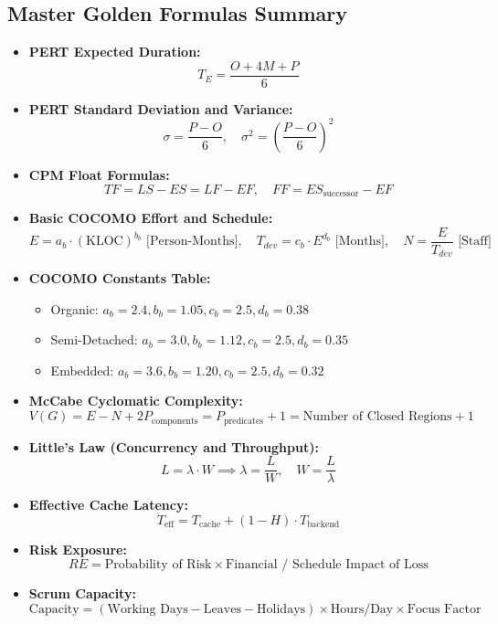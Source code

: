 \subsection*{Master Golden Formulas Summary}
\begin{tcolorbox}[colback=white,colframe=blue!75!black,title=\textbf{Essential Software Engineering Formulas}]
\begin{itemize}[leftmargin=1.5em]
    \item \textbf{PERT Expected Duration:}
    \[
    T_E = \frac{O + 4M + P}{6}
    \]
    \item \textbf{PERT Standard Deviation and Variance:}
    \[
    \sigma = \frac{P - O}{6}, \quad \sigma^2 = \left(\frac{P - O}{6}\right)^2
    \]
    \item \textbf{CPM Float Formulas:}
    \[
    TF = LS - ES = LF - EF, \quad FF = ES_{\text{successor}} - EF
    \]
    \item \textbf{Basic COCOMO Effort and Schedule:}
    \[
    E = a_b \cdot (\text{KLOC})^{b_b} \text{ [Person-Months]}, \quad T_{dev} = c_b \cdot E^{d_b} \text{ [Months]}, \quad N = \frac{E}{T_{dev}} \text{ [Staff]}
    \]
    \item \textbf{COCOMO Constants Table:}
    \begin{itemize}
        \item Organic: $a_b = 2.4, b_b = 1.05, c_b = 2.5, d_b = 0.38$
        \item Semi-Detached: $a_b = 3.0, b_b = 1.12, c_b = 2.5, d_b = 0.35$
        \item Embedded: $a_b = 3.6, b_b = 1.20, c_b = 2.5, d_b = 0.32$
    \end{itemize}
    \item \textbf{McCabe Cyclomatic Complexity:}
    \[
    V(G) = E - N + 2P_{\text{components}} = P_{\text{predicates}} + 1 = \text{Number of Closed Regions} + 1
    \]
    \item \textbf{Little's Law (Concurrency and Throughput):}
    \[
    L = \lambda \cdot W \implies \lambda = \frac{L}{W}, \quad W = \frac{L}{\lambda}
    \]
    \item \textbf{Effective Cache Latency:}
    \[
    T_{\text{eff}} = T_{\text{cache}} + (1 - H) \cdot T_{\text{backend}}
    \]
    \item \textbf{Risk Exposure:}
    \[
    RE = \text{Probability of Risk} \times \text{Financial / Schedule Impact of Loss}
    \]
    \item \textbf{Scrum Capacity:}
    \[
    \text{Capacity} = (\text{Working Days} - \text{Leaves} - \text{Holidays}) \times \text{Hours/Day} \times \text{Focus Factor}
    \]
\end{itemize}
\end{tcolorbox}

